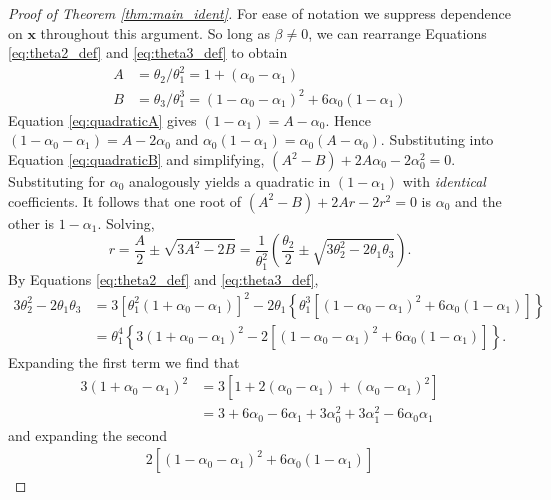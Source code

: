 
\begin{proof}[Proof of Theorem \ref{thm:main_ident}]
  For ease of notation we suppress dependence on $\mathbf{x}$ throughout this argument.
  So long as $\beta \neq 0$, we can rearrange Equations \ref{eq:theta2_def} and \ref{eq:theta3_def} to obtain 
  \begin{align}
    \label{eq:quadraticA}
  A &= \theta_2/\theta_1^2 = 1 + (\alpha_0 - \alpha_1)  \\
  \label{eq:quadraticB}
  B &= \theta_3/\theta_1^3 = (1 - \alpha_0 - \alpha_1)^2 + 6 \alpha_0 (1 - \alpha_1)
  \end{align}
  Equation \ref{eq:quadraticA} gives $(1 - \alpha_1)= A - \alpha_0$.
  Hence $(1 - \alpha_0 - \alpha_1) = A - 2\alpha_0$ and $\alpha_0(1 - \alpha_1) = \alpha_0(A - \alpha_0)$.
  Substituting into Equation \ref{eq:quadraticB} and simplifying, $(A^2 - B) + 2A \alpha_0 - 2\alpha_0^2=0$.
  Substituting for $\alpha_0$ analogously yields a quadratic in $(1 - \alpha_1)$ with \emph{identical} coefficients.
It follows that one root of $(A^2-B) + 2Ar - 2r^2=0$ is $\alpha_0$ and the other is $1 - \alpha_1$.
Solving,
  \begin{equation}
    r = \frac{A}{2} \pm \sqrt{3 A^2 - 2B} = \frac{1}{\theta_1^2}\left(\frac{\theta_2}{2} \pm  \sqrt{3\theta_2^2  - 2\theta_1 \theta_3}\right).
  \end{equation}
By Equations \ref{eq:theta2_def} and \ref{eq:theta3_def}, 
  \begin{align*}
    3\theta^2_2 - 2\theta_1 \theta_3 &= 3 \left[ \theta_1^2 \left( 1 + \alpha_0 - \alpha_1 \right) \right]^2 - 2 \theta_1 \left\{ \theta_1^3 \left[ (1 - \alpha_0 - \alpha_1)^2 + 6\alpha_0 (1 - \alpha_1) \right] \right\} \\
    &= \theta_1^4 \left\{ 3(1 + \alpha_0 - \alpha_1)^2 - 2 \left[ (1 - \alpha_0 - \alpha_1)^2 + 6 \alpha_0 (1 - \alpha_1) \right] \right\}.
  \end{align*}
Expanding the first term we find that 
  \begin{align*}
    3(1 + \alpha_0 - \alpha_1)^2 
    &= 3\left[ 1 + 2(\alpha_0 - \alpha_1) + (\alpha_0 - \alpha_1)^2 \right]\\
    &= 3 + 6\alpha_0 - 6\alpha_1 + 3 \alpha_0^2 + 3 \alpha_1^2 - 6\alpha_0\alpha_1 
  \end{align*}
and expanding the second 
  \begin{align*}
    2\left[ (1 - \alpha_0 - \alpha_1)^2 + 6\alpha_0(1 - \alpha_1) \right]

\end{align*}
\end{proof}
